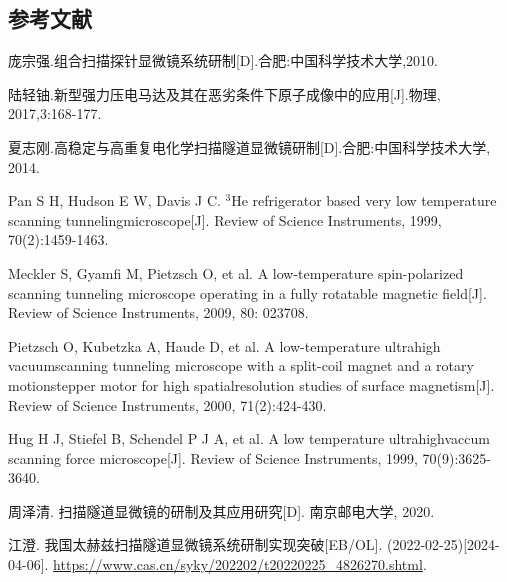 \documentclass{article}
\begin{document}
\begin{spacing}{1.5}
	
	
\newpage
{}
\section*{参考文献} %
\setParDis %
\renewcommand{\section}[2]{}
%
\begin{thebibliography}{25}
	 庞宗强.组合扫描探针显微镜系统研制[D].合肥:中国科学技术大学,2010.
	
	 陆轻铀.新型强力压电马达及其在恶劣条件下原子成像中的应用[J].物理, 2017,3:168-177.
	
	 夏志刚.高稳定与高重复电化学扫描隧道显微镜研制[D].合肥:中国科学技术大学, 2014.
	
	 Pan S H, Hudson E W, Davis J C. $^\text{3}$He refrigerator based very low temperature scanning tunnelingmicroscope[J]. Review of Science Instruments, 1999, 70(2):1459-1463.
	
	 Meckler S, Gyamfi M, Pietzsch O, et al. A low-temperature spin-polarized scanning tunneling microscope operating in a fully rotatable magnetic field[J]. Review of Science Instruments, 2009, 80: 023708.
	
	 Pietzsch O, Kubetzka A, Haude D, et al. A low-temperature ultrahigh vacuumscanning tunneling microscope with a split-coil magnet and a rotary motionstepper motor for high spatialresolution studies of surface magnetism[J]. Review of Science Instruments, 2000, 71(2):424-430.
	
	Hug H J, Stiefel B, Schendel P J A, et al. A low temperature ultrahighvaccum scanning force microscope[J]. Review of Science Instruments, 1999, 70(9):3625-3640.
	
	 周泽清. 扫描隧道显微镜的研制及其应用研究[D]. 南京邮电大学, 2020.
	
	 江澄. 我国太赫兹扫描隧道显微镜系统研制实现突破[EB/OL]. (2022-02-25)[2024-04-06]. \href{https://www.cas.cn/syky/202202/t20220225\_4826270.shtml}{https://www.cas.cn/syky/202202/t20220225\_4826270.shtml}.
	

\end{thebibliography}
\end{spacing}
\end{document}
